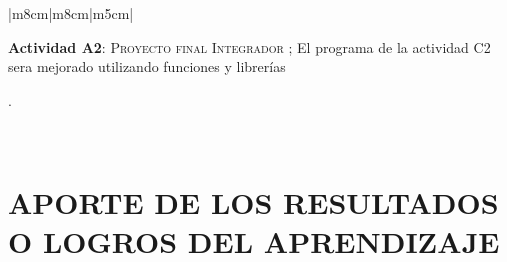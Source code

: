 \documentclass[a4paper,12pt,spanish]{article}
\begin{document}
\begin{tabular}[H]{|m{8cm}|m{8cm}|m{5cm}|}
\begin{minipage}[H]{1.0\linewidth}
    
   \colorbox{red!50}{\parbox[t]{2in}{ \textbf{Actividad A2}: \textsc{Proyecto final Integrador }; El programa de la actividad C2 sera mejorado utilizando funciones y librerías}}. 
    \vspace{2cm}
    \vspace{0.2cm}
  \end{minipage}


  \\ \hline

\end{tabular}


\newpage

\section{APORTE DE LOS RESULTADOS O LOGROS DEL APRENDIZAJE}
\label{sec:aporte-de-los}
\end{document}

